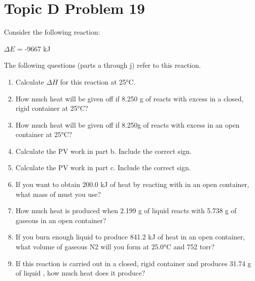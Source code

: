 \documentclass[10pt]{article}
\begin{document}
    \section{Topic D Problem 19}
        Consider the following reaction:
        \begin{center}
             $\Delta E$ = -9667 kJ
        \end{center}
        The following questions (parts a through j) refer to this reaction.
        \begin{enumerate}[label=\alph*)]
            \item   Calculate $\Delta H$ for this reaction at 25\unit{\celsius}.
            \item   How much heat will be given off if 8.250 g of  reacts with excess  in a closed, rigid container at 25\unit{\celsius}?
            \item   How much heat will be given off if 8.250g of  reacts with excess  in an open container at 25\unit{\celsius}?
            \item   Calculate the PV work in part b. Include the correct sign.
            \item   Calculate the PV work in part c. Include the correct sign.
            \item   If you want to obtain 200.0 kJ of heat by reacting  with  in an open container, what mass of  must you use?
            \item   How much heat is produced when 2.199 g of liquid  reacts with 5.738 g of gaseous  in an open container?
            \item   If you burn enough liquid  to produce 841.2 kJ of heat in an open container, what volume of gaseous N2 will you form at 25.0\unit{\celsius} and 752 torr?
            \item   If this reaction is carried out in a closed, rigid container and produces 31.74 g of liquid , how much heat does it produce?
        \end{enumerate}
        
\end{document}
